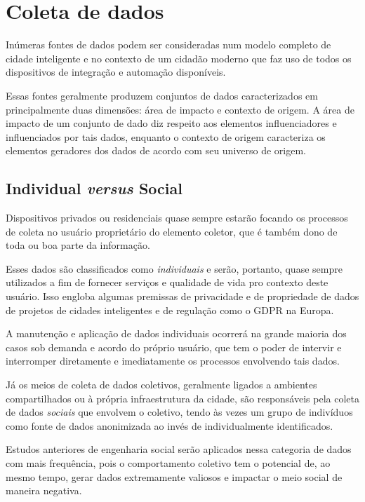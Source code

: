 \chapter{Coleta de dados} \label{c:coleta_de_dados}

Inúmeras fontes de dados podem ser consideradas num modelo completo de cidade inteligente e no contexto de um cidadão moderno que faz uso de todos os dispositivos de integração e automação disponíveis.

Essas fontes geralmente produzem conjuntos de dados caracterizados em principalmente duas dimensões: área de impacto e contexto de origem. A área de impacto de um conjunto de dado diz respeito aos elementos influenciadores e influenciados por tais dados, enquanto o contexto de origem caracteriza os elementos geradores dos dados de acordo com seu universo de origem.

\section{Individual \textit{versus} Social} \label{s:individual_vs_social}

Dispositivos privados ou residenciais quase sempre estarão focando os processos de coleta no usuário proprietário do elemento coletor, que é também dono de toda ou boa parte da informação.

Esses dados são classificados como \textit{individuais} e serão, portanto, quase sempre utilizados a fim de fornecer serviços e qualidade de vida pro contexto deste usuário. Isso engloba algumas premissas de privacidade e de propriedade de dados de projetos de cidades inteligentes e de regulação como o GDPR \cite{eu:gdpr} na Europa.

A manutenção e aplicação de dados individuais ocorrerá na grande maioria dos casos sob demanda e acordo do próprio usuário, que tem o poder de intervir e interromper diretamente e imediatamente os processos envolvendo tais dados.

Já os meios de coleta de dados coletivos, geralmente ligados a ambientes compartilhados ou à própria infraestrutura da cidade, são responsáveis pela coleta de dados \textit{sociais} que envolvem o coletivo, tendo às vezes um grupo de indivíduos como fonte de dados anonimizada ao invés de individualmente identificados.

Estudos anteriores de engenharia social serão aplicados nessa categoria de dados com mais frequência, pois o comportamento coletivo tem o potencial de, ao mesmo tempo, gerar dados extremamente valiosos e impactar o meio social de maneira negativa.

